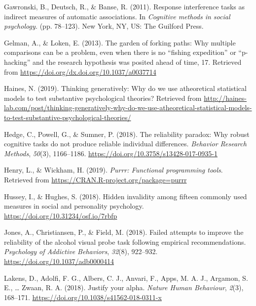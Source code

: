 \documentclass[english,man,floatsintext]{apa6}
\begin{document}
\leavevmode\hypertarget{ref-gawronski_response_2011-1}{}%
Gawronski, B., Deutsch, R., \& Banse, R. (2011). Response interference tasks as indirect measures of automatic associations. In \emph{Cognitive methods in social psychology.} (pp. 78--123). New York, NY, US: The Guilford Press.

\leavevmode\hypertarget{ref-gelman_garden_2013}{}%
Gelman, A., \& Loken, E. (2013). The garden of forking paths: Why multiple comparisons can be a problem, even when there is no ``ﬁshing expedition'' or ``p-hacking'' and the research hypothesis was posited ahead of time, 17. Retrieved from \url{https://doi.org/dx.doi.org/10.1037/a0037714}

\leavevmode\hypertarget{ref-haines_thinking_2019}{}%
Haines, N. (2019). Thinking generatively: Why do we use atheoretical statistical models to test substantive psychological theories? Retrieved from \url{http://haines-lab.com/post/thinking-generatively-why-do-we-use-atheoretical-statistical-models-to-test-substantive-psychological-theories/}

\leavevmode\hypertarget{ref-hedge_reliability_2018}{}%
Hedge, C., Powell, G., \& Sumner, P. (2018). The reliability paradox: Why robust cognitive tasks do not produce reliable individual differences. \emph{Behavior Research Methods}, \emph{50}(3), 1166--1186. \url{https://doi.org/10.3758/s13428-017-0935-1}

\leavevmode\hypertarget{ref-R-purrr}{}%
Henry, L., \& Wickham, H. (2019). \emph{Purrr: Functional programming tools}. Retrieved from \url{https://CRAN.R-project.org/package=purrr}

\leavevmode\hypertarget{ref-hussey_hidden_2018}{}%
Hussey, I., \& Hughes, S. (2018). Hidden invalidity among fifteen commonly used measures in social and personality psychology. \url{https://doi.org/10.31234/osf.io/7rbfp}

\leavevmode\hypertarget{ref-jones_failed_2018-1}{}%
Jones, A., Christiansen, P., \& Field, M. (2018). Failed attempts to improve the reliability of the alcohol visual probe task following empirical recommendations. \emph{Psychology of Addictive Behaviors}, \emph{32}(8), 922--932. \url{https://doi.org/10.1037/adb0000414}

\leavevmode\hypertarget{ref-lakens_justify_2018}{}%
Lakens, D., Adolfi, F. G., Albers, C. J., Anvari, F., Apps, M. A. J., Argamon, S. E., \ldots{} Zwaan, R. A. (2018). Justify your alpha. \emph{Nature Human Behaviour}, \emph{2}(3), 168--171. \url{https://doi.org/10.1038/s41562-018-0311-x}
\end{document}
